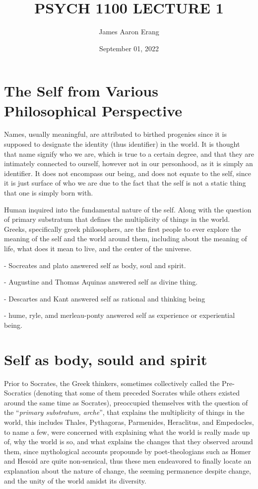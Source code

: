 \documentclass[12pt, UTF8]{article}
\title{PSYCH 1100 LECTURE 1}
\author{James Aaron Erang}
\date{September 01, 2022}
\begin{document}
	\maketitle
	
	\section*{The Self from Various Philosophical Perspective}
	
	Names, usually meaningful, are attributed to birthed progenies since it is supposed to designate the identity (thus identifier) in the world. It is thought that name signify who we are, which is true to a certain degree, and that they are intimately connected to ourself, however not in our personhood, as it is simply an identifier. It does not encompass our being, and does not equate to the self, since it is just surface of who we are due to the fact that the self is not a static thing that one is simply born with.
	
	Human inquired into the fundamental nature of the self. Along with the question of primary substratum that defines the multiplicity of things in the world. Greeks, specifically greek philosophers, are the first people to ever explore the meaning of the self and the world around them, including about the meaning of life, what does it mean to live, and the center of the universe.
	
	- Socreates and plato answered self as body, soul and spirit.
	
	- Augustine and Thomas Aquinas answered self as divine thing.
	
	- Descartes and Kant answered self as rational and thinking being
	
	- hume, ryle, amd merleau-ponty answered self as experience or experiential being.
	
	\section{Self as body, sould and spirit}
	
	Prior to Socrates, the Greek thinkers, sometimes collectively called the Pre-Socratics (denoting that some of them preceded Socrates while others existed around the same time as Socrates), preoccupied themselves with the question of the ``\textit{primary substratum, arche}'', that explains the multiplicity of things in the world, this includes Thales, Pythagoras, Parmenides, Heraclitus, and Empedocles, to name a few, were concerned with explaining what the world is really made up of, why the world is so, and what explains the changes that they observed around them, since mythological accounts propounde by poet-theologians such as Homer and Hesoid are quite non-sensical, thus these men endeavored to finally locate an explanation about the nature of change, the seeming permanence despite change, and the unity of the world amidst its diversity.
	
\end{document}
